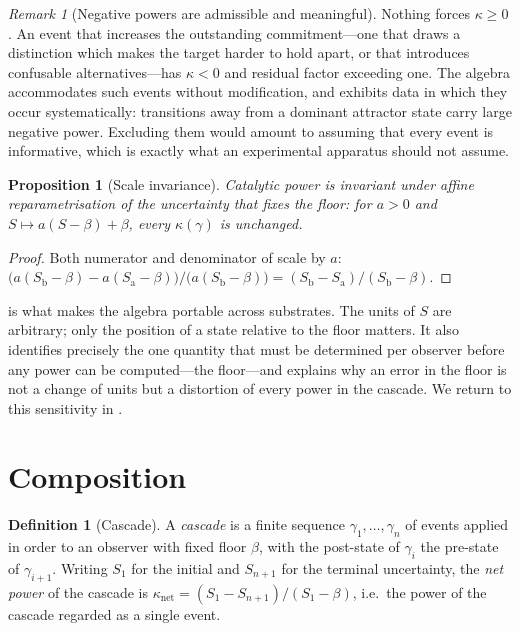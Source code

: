 \documentclass[11pt,a4paper]{article}
\theoremstyle{thmstyle}
\newtheorem{proposition}[theorem]{Proposition}
\theoremstyle{definition}
\newtheorem{definition}[theorem]{Definition}
\theoremstyle{remark}
\newtheorem{remark}[theorem]{Remark}
\newcommand{\flo}{\beta}
\newcommand{\kap}{\kappa}
\begin{document}
\begin{remark}[Negative powers are admissible and meaningful]
\label{rem:negative}
Nothing forces $\kap\ge0$. An event that increases the outstanding
commitment---one that draws a distinction which makes the target harder to
hold apart, or that introduces confusable alternatives---has $\kap<0$ and
residual factor exceeding one. The algebra accommodates such events without
modification, and  exhibits data in which they occur
systematically: transitions away from a dominant attractor state carry large
negative power. Excluding them would amount to assuming that every event is
informative, which is exactly what an experimental apparatus should not
assume.
\end{remark}

\begin{proposition}[Scale invariance]
\label{prop:scale}
Catalytic power is invariant under affine reparametrisation of the
uncertainty that fixes the floor: for $a>0$ and $S\mapsto a(S-\flo)+\flo$,
every $\kap(\gamma)$ is unchanged.
\end{proposition}

\begin{proof}
Both numerator and denominator of  scale by $a$:
$\bigl(a(S_{\mathrm{b}}-\flo)-a(S_{\mathrm{a}}-\flo)\bigr)/
\bigl(a(S_{\mathrm{b}}-\flo)\bigr)=
(S_{\mathrm{b}}-S_{\mathrm{a}})/(S_{\mathrm{b}}-\flo)$.
\end{proof}

 is what makes the algebra portable across substrates. The
units of $S$ are arbitrary; only the position of a state relative to the
floor matters. It also identifies precisely the one quantity that must be
determined per observer before any power can be computed---the floor---and
explains why an error in the floor is not a change of units but a distortion
of every power in the cascade. We return to this sensitivity in
.

\section{Composition}
\label{sec:composition}

\begin{definition}[Cascade]
\label{def:cascade}
A \emph{cascade} is a finite sequence $\gamma_1,\dots,\gamma_n$ of events
applied in order to an observer with fixed floor $\flo$, with the post-state
of $\gamma_i$ the pre-state of $\gamma_{i+1}$. Writing $S_1$ for the initial
and $S_{n+1}$ for the terminal uncertainty, the \emph{net power} of the
cascade is
$\kap_{\mathrm{net}}=(S_1-S_{n+1})/(S_1-\flo)$, i.e.\ the power of the
cascade regarded as a single event.
\end{definition}
\end{document}
